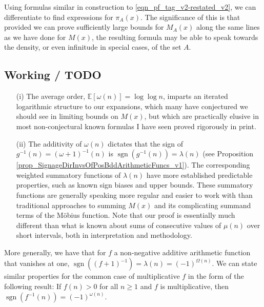 \documentclass[11pt,reqno,a4letter]{article}
\numberwithin{figure}{section}
\numberwithin{table}{section}
\theoremstyle{plain}
\numberwithin{theorem}{section}
\theoremstyle{definition}
\begin{document}
Using formulas similar in construction to \eqref{eqn_pf_tag_v2-restated_v2}, 
we can differentiate to find expressions for $\pi_A(x)$. The significance of this is that provided we can 
prove sufficiently large bounds for $M_A(x)$ along the same lines as we have done for $M(x)$, the 
resulting formula may be able to speak towards the density, or even infinitude in special cases, 
of the set $A$.

\subsection{Working / TODO} 

\begin{itemize} 
           \item[(i)] The average order, $\mathbb{E}[\omega(n)] = \log\log n$, imparts an iterated logarithmic structure 
           to our expansions, which many have conjectured we should see in limiting bounds on $M(x)$, 
           but which are practically elusive in most non-conjectural known formulas I have seen 
           proved rigorously in print. 
           \item[(ii)] The additivity of $\omega(n)$ dictates that the sign of $g^{-1}(n) = (\omega+1)^{-1}(n)$ 
           is $\operatorname{sgn}(g^{-1}(n)) = \lambda(n)$ 
           (see Proposition \ref{prop_SignageDirInvsOfPosBddArithmeticFuncs_v1}). 
           The corresponding weighted summatory functions of 
           $\lambda(n)$ have more established predictable properties, such as known sign biases and upper bounds. 
           These summatory functions are generally speaking more regular and easier to work with than 
           traditional approaches to summing $M(x)$ 
           and its complicating summand terms of the M\"obius function. 
           Note that our proof is essentially much different than what is known about sums of consecutive values of 
           $\mu(n)$ over short intervals, both in interpretation and methodology. 
           \end{itemize}


More generally, we have that for $f$ a non-negative additive arithmetic function that vanishes at one, 
$\operatorname{sgn}((f+1)^{-1}) = \lambda(n) = (-1)^{\Omega(n)}$. 
We can state similar properties for the common case of multiplicative $f$ in the 
form of the following result: If $f(n) > 0$ for all $n \geq 1$ and $f$ is multiplicative, then 
$\operatorname{sgn}(f^{-1}(n)) = (-1)^{\omega(n)}$. 

\newpage 
\renewcommand{\refname}{References} 
{}

\end{document}
